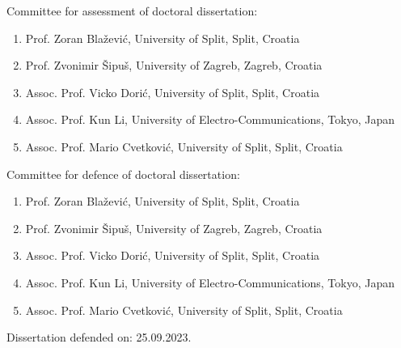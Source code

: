 \documentclass[12pt,twoside,onecolumn]{book}
\begin{document}
\begin{titlepage}
\begin{flushleft}
        \newpage
        \textnormal{}
        \vskip 30mm
        Committee for assessment of doctoral dissertation:
        \begin{enumerate}
        \item Prof. Zoran Blažević, University of Split, Split, Croatia
        \item Prof. Zvonimir Šipuš, University of Zagreb, Zagreb, Croatia
        \item Assoc. Prof. Vicko Dorić, University of Split, Split, Croatia
        \item Assoc. Prof. Kun Li, University of Electro-Communications, Tokyo, Japan
        \item Assoc. Prof. Mario Cvetković, University of Split, Split, Croatia
        \end{enumerate}
        
        \vskip 15mm
        Committee for defence of doctoral dissertation:
        \begin{enumerate}
        \item Prof. Zoran Blažević, University of Split, Split, Croatia
        \item Prof. Zvonimir Šipuš, University of Zagreb, Zagreb, Croatia
        \item Assoc. Prof. Vicko Dorić, University of Split, Split, Croatia
        \item Assoc. Prof. Kun Li, University of Electro-Communications, Tokyo, Japan
        \item Assoc. Prof. Mario Cvetković, University of Split, Split, Croatia
        \end{enumerate}
        \vskip 15mm
        Dissertation defended on: 25.09.2023.
    \end{flushleft}
    
    
    
    
    
    
\end{titlepage}

\tableofcontents
\setcounter{tocdepth}{2}
\setcounter{secnumdepth}{2}

\clearpage
{}
\setlength\cftbeforetabskip{10pt}
\begin{spacing}{1}
\listoftables
{}
\end{spacing}
\end{document}
